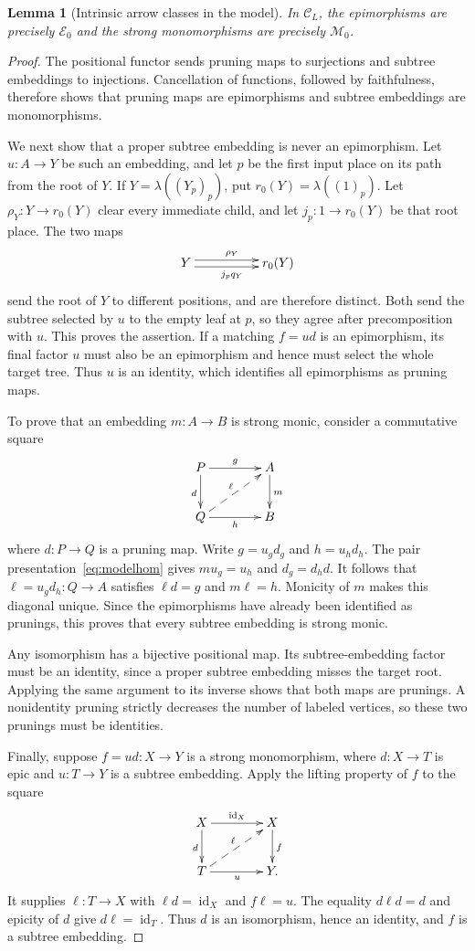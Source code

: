 \documentclass[11pt,a4paper]{article}
\theoremstyle{plain}
\newtheorem{lemma}[theorem]{Lemma}
\theoremstyle{definition}
\theoremstyle{remark}
\newcommand{\C}{\mathcal C}
\newcommand{\Ocat}{\mathcal M}
\newcommand{\Dcat}{\mathcal E}
\newcommand{\one}{1}
\newcommand{\id}{\operatorname{id}}
\begin{document}
\begin{lemma}[Intrinsic arrow classes in the model]\label{prop:modelclasses}
In $\C_L$, the epimorphisms are precisely $\Dcat_0$ and the strong
monomorphisms are precisely $\Ocat_0$.
\end{lemma}
\begin{proof}
The positional functor sends pruning maps to surjections and
subtree embeddings to injections. Cancellation of functions, followed
by faithfulness, therefore shows that pruning maps are epimorphisms
and subtree embeddings are monomorphisms.

We next show that a proper subtree embedding is never an
epimorphism. Let $u:A\to Y$ be such an embedding, and let $p$
be the first input place on its path from the root of $Y$.
If $Y=\lambda((Y_p)_p)$, put $r_0(Y)=\lambda((\one)_p)$.
Let $\rho_Y:Y\to r_0(Y)$ clear every immediate child, and let
$j_p:\one\to r_0(Y)$ be that root place. The two maps
\[
 \xymatrix@C=5em{
Y \ar@<0.6ex>[r]^{\rho_Y} \ar@<-0.6ex>[r]_{j_pq_Y} & r_0(Y)
 }
\]
send the root of $Y$ to different positions, and are therefore
distinct. Both send the subtree selected by $u$ to the empty leaf
at $p$, so they agree after precomposition with $u$. This proves
the assertion. If a matching $f=ud$ is an epimorphism, its final
factor $u$ must also be an epimorphism and hence must select the
whole target tree. Thus $u$ is an identity, which identifies all
epimorphisms as pruning maps.

To prove that an embedding $m:A\to B$ is strong monic, consider a
commutative square
\[
 \xymatrix@C=4em@R=2.5em{
P\ar[r]^g\ar[d]_d&A\ar[d]^m\\
Q\ar[r]_h\ar@{-->}[ur]^{\ell}&B
 }
\]
where $d:P\to Q$ is a pruning map. Write $g=u_gd_g$ and $h=u_hd_h$.
The pair presentation~\eqref{eq:modelhom} gives
$mu_g=u_h$ and $d_g=d_hd$. It follows that $\ell=u_gd_h:Q\to A$ satisfies $\ell d=g$ and
$m\ell=h$. Monicity of $m$ makes this diagonal unique. Since the
epimorphisms have already been identified as prunings, this proves
that every subtree embedding is strong monic.

Any isomorphism has a bijective positional map. Its subtree-embedding
factor must be an identity, since a proper subtree embedding misses
the target root. Applying the same argument to its inverse shows
that both maps are prunings. A nonidentity pruning strictly
decreases the number of labeled vertices, so these two prunings
must be identities.

Finally, suppose $f=ud:X\to Y$ is a strong monomorphism, where
$d:X\to T$ is epic and $u:T\to Y$ is a subtree embedding.
Apply the lifting property of $f$ to the square
\[
\xymatrix@C=4em@R=2.5em{
X\ar[r]^{\id_X}\ar[d]_d&X\ar[d]^f\\
T\ar[r]_u\ar@{-->}[ur]^{\ell}&Y.
}
\]
It supplies
$\ell:T\to X$ with $\ell d=\id_X$ and $f\ell=u$.
The equality $d\ell d=d$ and epicity of $d$ give
$d\ell=\id_T$. Thus $d$ is an isomorphism, hence an identity,
and $f$ is a subtree embedding.
\end{proof}
\end{document}
